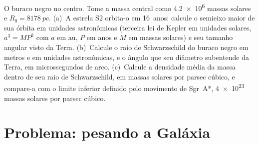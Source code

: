 \begin{exercise}[$\star\star\star$]\label{exo:b3:milky-way-galaxies:12}
O buraco negro no centro. Tome a massa central como
\num{4.2e6} massas solares e $R_0 = \qty{8178}{pc}$. (a)~A estrela S2
orbita-o em \num{16}~anos: calcule o semieixo maior de sua órbita em
unidades astronômicas (terceira lei de Kepler em unidades solares, $a^3 = MP^2$ com
$a$ em au, $P$ em anos e $M$ em massas solares) e seu tamanho angular visto
da Terra. (b)~Calcule o raio de Schwarzschild do buraco negro em
metros e em unidades astronômicas, e o ângulo que seu diâmetro
subentende da Terra, em microssegundos de arco. (c)~Calcule a densidade média
da massa dentro de seu raio de Schwarzschild, em massas solares por
parsec cúbico, e compare-a com o limite inferior definido pelo movimento de Sgr~A*,
\num{4e23} massas solares por parsec cúbico.
\end{exercise}

\section{Problema: pesando a Galáxia}

